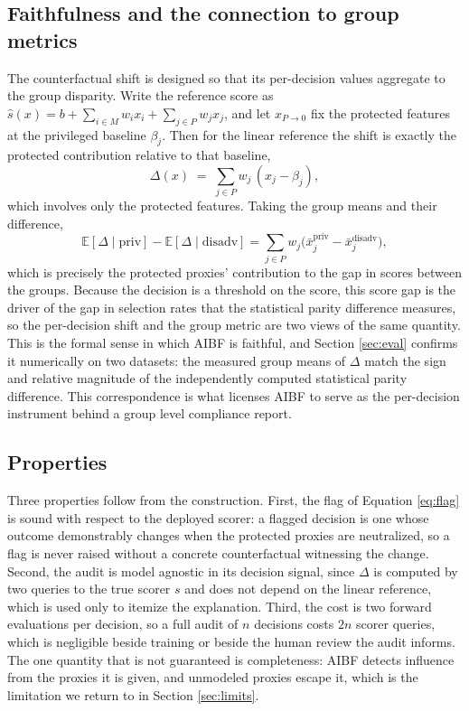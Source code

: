 \documentclass[conference]{IEEEtran}
\begin{document}
\subsection{Faithfulness and the connection to group metrics}
The counterfactual shift is designed so that its per-decision values aggregate to the
group disparity. Write the reference score as $\hat s(x)=b+\sum_{i\in M} w_i x_i +
\sum_{j\in P} w_j x_j$, and let $x_{P\to0}$ fix the protected features at the privileged
baseline $\beta_j$. Then for the linear reference the shift is exactly the protected
contribution relative to that baseline,
\begin{equation}
\Delta(x) \;=\; \sum_{j\in P} w_j\,(x_j - \beta_j),
\label{eq:deltalin}
\end{equation}
which involves only the protected features. Taking the group means and their difference,
\begin{equation}
\mathbb{E}[\Delta \mid \text{priv}] - \mathbb{E}[\Delta \mid \text{disadv}]
= \sum_{j\in P} w_j\big(\bar{x}_j^{\text{priv}} - \bar{x}_j^{\text{disadv}}\big),
\label{eq:groupgap}
\end{equation}
which is precisely the protected proxies' contribution to the gap in scores between the
groups. Because the decision is a threshold on the score, this score gap is the driver
of the gap in selection rates that the statistical parity difference measures, so the
per-decision shift and the group metric are two views of the same quantity. This is the
formal sense in which AIBF is faithful, and Section \ref{sec:eval} confirms it
numerically on two datasets: the measured group means of $\Delta$ match the sign and
relative magnitude of the independently computed statistical parity difference. This
correspondence is what licenses AIBF to serve as the per-decision instrument behind a
group level compliance report.

\subsection{Properties}
Three properties follow from the construction. First, the flag of Equation
\eqref{eq:flag} is sound with respect to the deployed scorer: a flagged
decision is one whose outcome demonstrably changes when the protected proxies are
neutralized, so a flag is never raised without a concrete counterfactual witnessing
the change. Second, the audit is model agnostic in its decision signal, since
$\Delta$ is computed by two queries to the true scorer $s$ and does not depend on the
linear reference, which is used only to itemize the explanation. Third, the cost is
two forward evaluations per decision, so a full audit of $n$ decisions costs $2n$
scorer queries, which is negligible beside training or beside the human review the
audit informs. The one quantity that is not guaranteed is completeness: AIBF detects
influence from the proxies it is given, and unmodeled proxies escape it, which is the
limitation we return to in Section \ref{sec:limits}.
\end{document}
